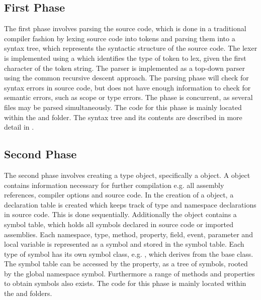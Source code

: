 \subsection{First Phase}
\label{subsec:roslyn_first_phase}
The first phase involves parsing the source code, which is done in a traditional compiler fashion by lexing source code into tokens and parsing them into a syntax tree, which represents the syntactic structure of the source code. The lexer is implemented using a  which identifies the type of token to lex, given the first character of the token string. The parser is implemented as a top-down parser using the common recursive descent approach. The parsing phase will check for syntax errors in source code, but does not have enough information to check for semantic errors, such as scope or type errors. The phase is concurrent, as several files may be parsed simultaneously\cite{sadovRoslynPerf}. The code for this phase is mainly located within the  and  folder. The syntax tree and its contents are described in more detail in .

\subsection{Second Phase}
\label{subsec:roslyn_second_phase}
The second phase involves creating a  type object, specifically a  object. A  object contains information necessary for further compilation e.g. all assembly references, compiler options and source code. In the creation of a  object, a declaration table is created which keeps track of type and namespace declarations in source code\cite{sadovRoslynPerf}. This is done sequentially\cite{sadovRoslynPerf}. Additionally the  object contains a symbol table, which holds all symbols declared in source code or imported assemblies. Each namespace, type, method, property, field, event, parameter and local variable is represented as a symbol and stored in the symbol table\cite[p. 14]{ng2012roslyn}. Each type of symbol has its own symbol class, e.g. , which derives from the base  class. The symbol table can be accessed by the  property, as a tree of symbols, rooted by the global namespace symbol. Furthermore a range of methods and properties to obtain symbols also exists. The code for this phase is mainly located within the  and  folders.

